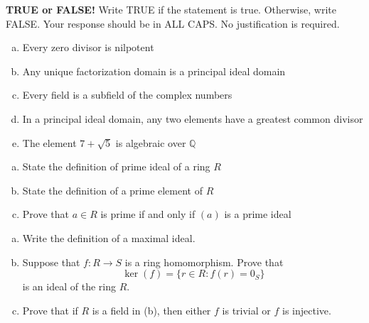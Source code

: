 \documentclass[11pt]{exam}
\theoremstyle{definition}
\begin{document}
%
%
%

\begin{questions}

\addpoints

\question[10]\mbox{}
\textbf{TRUE or FALSE!}  Write  TRUE if the statement is true.  Otherwise, write FALSE.  Your response should be in ALL CAPS.  No justification is required.
\begin{enumerate}[(a)]
\item  
Every zero divisor is nilpotent
\vspace{1.3in}
\item  
Any unique factorization domain is a principal ideal domain
\vspace{1.3in}
\item  
Every field is a subfield of the complex numbers
\vspace{1.3in}
\item  
In a principal ideal domain, any two elements have a greatest common divisor
\vspace{1.3in}
\item  
The element $7+\sqrt{5}$ is algebraic over $\mathbb{Q}$
\vspace{1.3in}
\end{enumerate}

\newpage
\question[10]\mbox{}
\begin{enumerate}[(a)]
\item  State the definition of prime ideal of a ring $R$
\vspace{2in}
\item  State the definition of a prime element of $R$
\vspace{2in}
\item  Prove that $a\in R$ is prime if and only if $(a)$ is a prime ideal
\end{enumerate}

\newpage
\question[10]\mbox{}

\begin{enumerate}[(a)]
\item  Write the definition of a maximal ideal.
\vspace{2in}
\item  Suppose that $f: R\rightarrow S$ is a ring homomorphism.  Prove that
$$\ker(f) = \{r\in R: f(r) = 0_S\}$$
is an ideal of the ring $R$.
\vspace{3in}
\item  Prove that if $R$ is a field in (b), then either $f$ is trivial or $f$ is injective.
\end{enumerate}



\end{questions}
\end{document}
